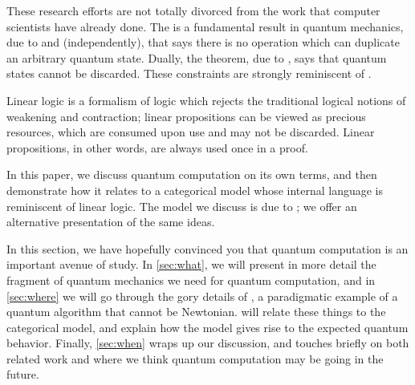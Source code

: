 These research efforts are not totally divorced from the work that computer
scientists have already done.  The  is a fundamental
result in quantum mechanics, due to  and
 (independently), that says there is no operation which can
duplicate an arbitrary quantum state.  Dually, the  theorem,
due to , says that quantum states cannot be discarded.  These
constraints are strongly reminiscent of .

Linear logic is a formalism of logic which rejects the traditional logical
notions of weakening and contraction; linear propositions can be viewed as
precious resources, which are consumed upon use and may not be discarded.
Linear propositions, in other words, are always used once in a proof.

In this paper, we discuss quantum computation on its own terms, and then
demonstrate how it relates to a categorical model whose internal language is
reminiscent of linear logic.  The model we discuss is due to ; we offer an alternative presentation of
the same ideas.

In this section, we have hopefully convinced you that quantum computation is an
important avenue of study.  In \cref{sec:what}, we will present in more detail
the fragment of quantum mechanics we need for quantum computation, and in
\cref{sec:where} we will go through the gory details of , a paradigmatic example of a quantum algorithm that cannot be
Newtonian.   will relate these things to the categorical model,
and explain how the model gives rise to the expected quantum behavior.  Finally,
\cref{sec:when} wraps up our discussion, and touches briefly on both related
work and where we think quantum computation may be going in the future.
